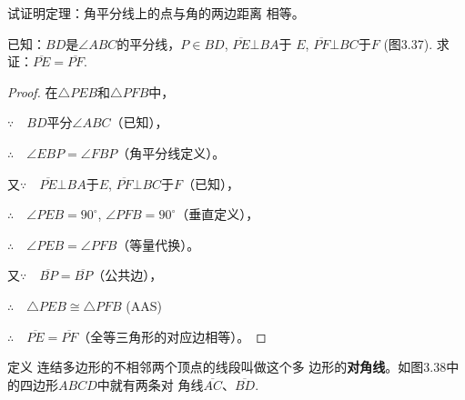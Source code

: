 \begin{example}
    试证明定理：角平分线上的点与角的两边距离
相等。

已知：$BD$是$\angle ABC$的平分线，$P\in BD$, $\overline{PE}\bot BA$于
$E$, $\overline{PF}\bot BC$于$F$ (图3.37). 
求证：$\overline{PE}=\overline{PF}$.
\end{example}

\begin{figure}[htp]
    \centering
{}
    \caption{}
\end{figure}

\begin{proof}
在$\triangle PEB$和$\triangle PFB$中，

$\because\quad BD$平分$\angle ABC$（已知），

$\therefore\quad \angle EBP=\angle FBP$（角平分线定义）。

又$\because\quad \overline{PE}\bot BA$于$E$, 
$\overline{PF}\bot BC$于$F$（已知），

$\therefore\quad \angle PEB=90^{\circ}$, $\angle PFB=90^{\circ}$（垂直定义），

$\therefore\quad \angle PEB=\angle PFB$（等量代换）。

又$\because\quad \overline{BP}=\overline{BP}$（公共边），

$\therefore\quad \triangle PEB\cong \triangle PFB$ (AAS)

$\therefore\quad \overline{PE}=\overline{PF}$（全等三角形的对应边相等）。
\end{proof}

\begin{blk}
    {定义} 连结多边形的不相邻两个顶点的线段叫做这个多
    边形的\textbf{对角线}。如图3.38中的四边形$ABCD$中就有两条对
    角线$\overline{AC}$、$\overline{BD}$.
\end{blk}

